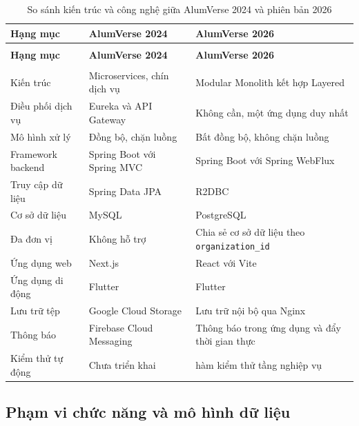 \documentclass[12pt,a4paper,oneside]{report}
\begin{document}
\renewcommand{\arraystretch}{1.25}
{\small
\begin{longtable}{|>{\raggedright\arraybackslash}p{3.6cm}|>{\raggedright\arraybackslash}p{4.9cm}|>{\raggedright\arraybackslash}p{4.9cm}|}
\caption{So sánh kiến trúc và công nghệ giữa AlumVerse 2024 và phiên bản 2026}\label{tab:compare2024}\\
\hline \textbf{Hạng mục} & \textbf{AlumVerse 2024} & \textbf{AlumVerse 2026} \\ \hline
\endfirsthead
\multicolumn{3}{l}{\itshape\small (tiếp theo trang trước)}\\[2pt]
\hline \textbf{Hạng mục} & \textbf{AlumVerse 2024} & \textbf{AlumVerse 2026} \\ \hline
\endhead
\hline \multicolumn{3}{r}{\itshape\small (còn tiếp)}\\
\endfoot
\hline
\endlastfoot
Kiến trúc & Microservices, chín dịch vụ & Modular Monolith kết hợp Layered \\ \hline
Điều phối dịch vụ & Eureka và API Gateway & Không cần, một ứng dụng duy nhất \\ \hline
Mô hình xử lý & Đồng bộ, chặn luồng & Bất đồng bộ, không chặn luồng \\ \hline
Framework backend & Spring Boot với Spring MVC & Spring Boot với Spring WebFlux \\ \hline
Truy cập dữ liệu & Spring Data JPA & R2DBC \\ \hline
Cơ sở dữ liệu & MySQL & PostgreSQL \\ \hline
Đa đơn vị & Không hỗ trợ & Chia sẻ cơ sở dữ liệu theo \texttt{organization\_id} \\ \hline
Ứng dụng web & Next.js & React với Vite \\ \hline
Ứng dụng di động & Flutter & Flutter \\ \hline
Lưu trữ tệp & Google Cloud Storage & Lưu trữ nội bộ qua Nginx \\ \hline
Thông báo & Firebase Cloud Messaging & Thông báo trong ứng dụng và đẩy thời gian thực \\ \hline
Kiểm thử tự động & Chưa triển khai & 215 hàm kiểm thử tầng nghiệp vụ \\ \hline
\end{longtable}
}
\renewcommand{\arraystretch}{1}

\subsection{Phạm vi chức năng và mô hình dữ liệu}
\end{document}
